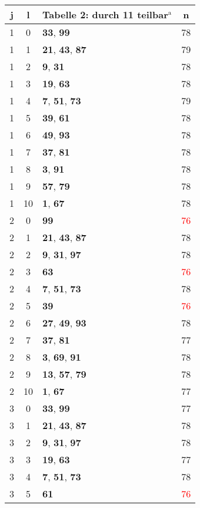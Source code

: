 \documentclass{article}
\begin{document}
\begin{minipage}[t]{0.5\textwidth}
\vspace{0pt}
\begin{tabular}{||c|c|l|c||}
	j&l&Tabelle 2: durch 11 teilbar$^{\mathrm{a}}$&n\\
	\hline
	1&0&\textbf{33}, \textbf{99}&78\\
	1&1&\textbf{21}, \textbf{43}, \textbf{87}&79\\
	1&2&\textbf{9}, \textbf{31}&78\\
	1&3&\textbf{19}, \textbf{63}&78\\
	1&4&\textbf{7}, \textbf{51}, \textbf{73}&79\\
	1&5&\textbf{39}, \textbf{61}&78\\
	1&6&\textbf{49}, \textbf{93}&78\\
	1&7&\textbf{37}, \textbf{81}&78\\
	1&8&\textbf{3}, \textbf{91}&78\\
	1&9&\textbf{57}, \textbf{79}&78\\
	1&10&\textbf{1}, \textbf{67}&78\\
	2&0&\textbf{99}&\textcolor{red}{76}\\
	2&1&\textbf{21}, \textbf{43}, \textbf{87}&78\\
	2&2&\textbf{9}, \textbf{31}, \textbf{97}&78\\
	2&3&\textbf{63}&\textcolor{red}{76}\\
	2&4&\textbf{7}, \textbf{51}, \textbf{73}&78\\
	2&5&\textbf{39}&\textcolor{red}{76}\\
	2&6&\textbf{27}, \textbf{49}, \textbf{93}&78\\
	2&7&\textbf{37}, \textbf{81}&77\\
	2&8&\textbf{3}, \textbf{69}, \textbf{91}&78\\
	2&9&\textbf{13}, \textbf{57}, \textbf{79}&78\\
	2&10&\textbf{1}, \textbf{67}&77\\
	3&0&\textbf{33}, \textbf{99}&77\\
	3&1&\textbf{21}, \textbf{43}, \textbf{87}&78\\
	3&2&\textbf{9}, \textbf{31}, \textbf{97}&78\\
	3&3&\textbf{19}, \textbf{63}&77\\
	3&4&\textbf{7}, \textbf{51}, \textbf{73}&78\\
	3&5&\textbf{61}&\textcolor{red}{76}\\
\end{tabular}
\end{minipage}
\end{document}
